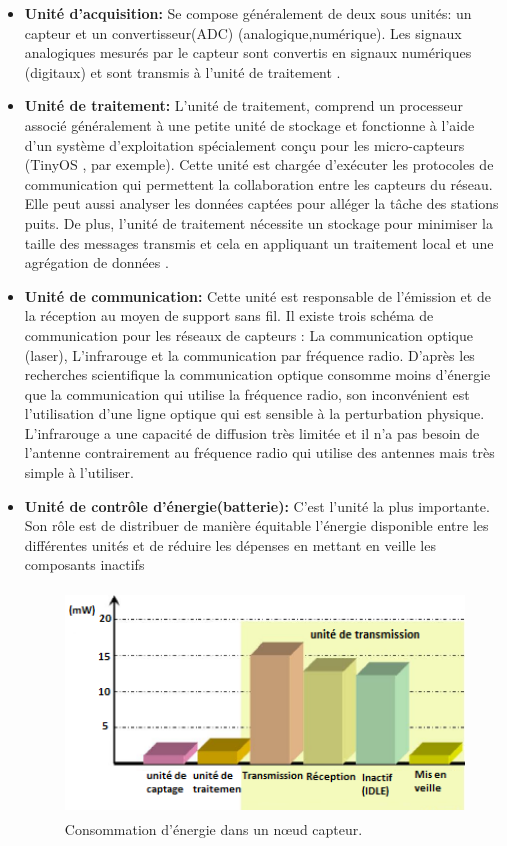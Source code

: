 \begin{itemize}
  \item \textbf{Unité d’acquisition: }Se compose généralement de deux sous unités: un capteur et un convertisseur(ADC) (analogique,numérique).
Les signaux analogiques mesurés par le capteur sont convertis en signaux numériques (digitaux) et sont transmis à l’unité de traitement \cite{mekidicheetude}.
 
  \item \textbf{Unité de traitement: }L’unité de traitement, comprend un processeur associé généralement à une petite unité de stockage et fonctionne à l’aide d’un système d’exploitation spécialement conçu pour les micro-capteurs (TinyOS \cite{hill2000system}, par exemple). Cette unité est chargée d’exécuter les protocoles de communication qui permettent la collaboration entre les capteurs du réseau. Elle peut aussi analyser les données captées pour alléger la tâche des stations puits. De plus, l’unité de traitement nécessite un stockage pour minimiser la taille des messages transmis et cela en appliquant un traitement local et une agrégation de données \cite{feng2002system}.
	\item \textbf{Unité de communication: }Cette unité est responsable de l’émission et de la réception au moyen de support sans fil. Il existe trois schéma de communication pour les réseaux de capteurs : La communication optique (laser), L’infrarouge et la communication par fréquence radio. D’après les recherches scientifique la communication optique consomme moins d’énergie que la communication qui utilise la fréquence radio, son inconvénient est l’utilisation  d’une ligne optique qui est sensible à la perturbation physique. L’infrarouge a une capacité de diffusion très limitée et il n’a pas besoin de l’antenne contrairement au fréquence radio qui utilise des antennes mais très simple à l’utiliser.
	\item \textbf{Unité de contrôle d’énergie(batterie): }C’est l’unité la plus importante. Son rôle est de distribuer de manière équitable l'énergie disponible entre les différentes unités et de réduire les dépenses en mettant en veille les composants inactifs\\
\begin{figure}[H]
	\centering
	\includegraphics[width=14cm,height=6cm]{Chap1/4.png}
	\caption{Consommation d’énergie dans un nœud capteur. \cite{raghunathan2005design,karl2007protocols}}
	\label{fig:CENC}
\end{figure}


\end{itemize}

